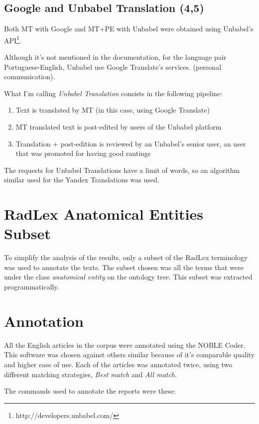 \subsection{Google and Unbabel Translation (4,5)}

Both MT with Google and MT+PE with Unbabel were obtained using Unbabel's API\footnote{http://developers.unbabel.com/}. 

Although it's not mentioned in the documentation, for the language pair Portuguese-English, Unbabel use Google Translate's services. (personal communication).

What I'm calling \textit{Unbabel Translation} consists in the following pipeline:

\begin{enumerate}
\item Text is translated by MT (in this case, using Google Translate)
\item MT translated text is post-edited by users of the Unbabel platform 
\item Translation + post-edition is reviewed by an Unbabel's senior user, an user that was promoted for having good rantings
\end{enumerate}

The requests for Unbabel Translations have a limit of words, so an algorithm similar used for the Yandex Translations was used. 

\section{RadLex Anatomical Entities Subset}

To simplify the analysis of the results, only a subset of the RadLex terminology was used to annotate the texts. The subset chosen was all the terms that were under the class \textit{anatomical entity} on the ontology tree. This subset was extracted programmatically. 

\section{Annotation}

All the English articles in the corpus were annotated using the NOBLE Coder. This software was chosen against others similar because of it's comparable quality and higher ease of use. Each of the articles was annotated twice, using two different matching strategies, \textit{Best match} and \textit{All match}.

The commands used to annotate the reports were these:



